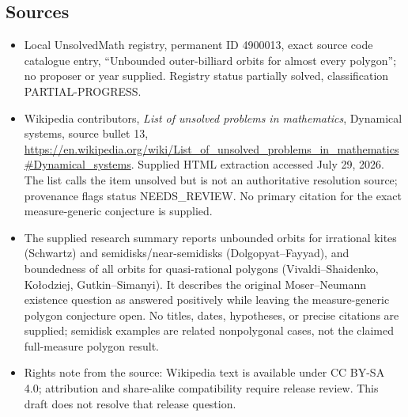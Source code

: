 \documentclass[11pt]{article}
\begin{document}
\subsection{Sources}
\begin{itemize}
\item Local UnsolvedMath registry, permanent ID 4900013, exact source code catalogue entry, ``Unbounded outer-billiard orbits for almost every polygon''; no proposer or year supplied. Registry status partially solved, classification PARTIAL-PROGRESS.
\item Wikipedia contributors, \emph{List of unsolved problems in mathematics}, Dynamical systems, source bullet 13, \url{https://en.wikipedia.org/wiki/List_of_unsolved_problems_in_mathematics#Dynamical_systems}. Supplied HTML extraction accessed July 29, 2026. The list calls the item unsolved but is not an authoritative resolution source; provenance flags status NEEDS\_REVIEW. No primary citation for the exact measure-generic conjecture is supplied.
\item The supplied research summary reports unbounded orbits for irrational kites (Schwartz) and semidisks/near-semidisks (Dolgopyat--Fayyad), and boundedness of all orbits for quasi-rational polygons (Vivaldi--Shaidenko, Ko\l odziej, Gutkin--Simanyi). It describes the original Moser--Neumann existence question as answered positively while leaving the measure-generic polygon conjecture open. No titles, dates, hypotheses, or precise citations are supplied; semidisk examples are related nonpolygonal cases, not the claimed full-measure polygon result.
\item Rights note from the source: Wikipedia text is available under CC BY-SA 4.0; attribution and share-alike compatibility require release review. This draft does not resolve that release question.
\end{itemize}
\end{document}
